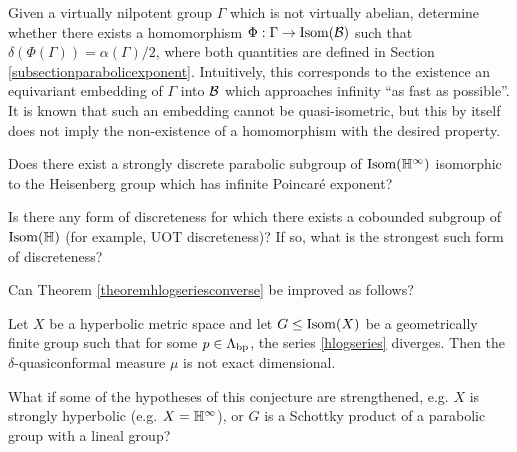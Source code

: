 \begin{problem}
Given a virtually nilpotent group $\Gamma$ which is not virtually abelian, determine whether there exists a homomorphism $\Phi:\Gamma\to \operatorname{Isom}(\mathcal B)$ such that $\delta(\Phi(\Gamma)) = \alpha(\Gamma)/2$, where both quantities are defined in Section \ref{subsectionparabolicexponent}. Intuitively, this corresponds to the existence an equivariant embedding of $\Gamma$ into $\mathcal B$ which approaches infinity ``as fast as possible''. It is known \cite[Theorem 1.3]{CTV1} that such an embedding cannot be quasi-isometric, but this by itself does not imply the non-existence of a homomorphism with the desired property.
\end{problem}

\begin{problem}
Does there exist a strongly discrete parabolic subgroup of $\Isom(\H^\infty)$ isomorphic to the Heisenberg group which has infinite Poincar\'e exponent?
\end{problem}

\begin{problem}
Is there any form of discreteness for which there exists a cobounded subgroup of $\Isom(\H)$ (for example, UOT discreteness)? If so, what is the strongest such form of discreteness?
\end{problem}


\begin{problem}
Can Theorem \ref{theoremhlogseriesconverse} be improved as follows?
\begin{conjecture*}
Let $X$ be a hyperbolic metric space and let $G\leq\operatorname{Isom}(X)$ be a geometrically finite group such that for some $p\in\Lambda_{\mathrm{bp}}$, the series \eqref{hlogseries} diverges. Then the $\delta$-quasiconformal measure $\mu$ is not exact dimensional.
\end{conjecture*}
What if some of the hypotheses of this conjecture are strengthened, e.g. $X$ is strongly hyperbolic (e.g. $X = \H^\infty$), or $G$ is a Schottky product of a parabolic group with a lineal group?
\end{problem}

\endinput